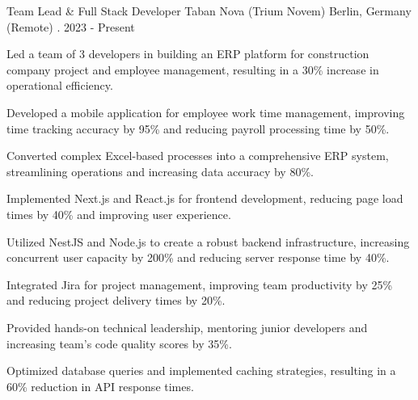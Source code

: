 

\begin{cventries}

  \cventry
    {Team Lead \& Full Stack Developer} %
    {Taban Nova (Trium Novem)} %
    {Berlin, Germany (Remote)} %
    {\shortmonthname[08]. 2023 - Present} %
    {
      \begin{cvitems} %
        \item {Led a team of 3 developers in building an ERP platform for construction company project and employee management, resulting in a 30\% increase in operational efficiency.}
        \item {Developed a mobile application for employee work time management, improving time tracking accuracy by 95\% and reducing payroll processing time by 50\%.}
        \item {Converted complex Excel-based processes into a comprehensive ERP system, streamlining operations and increasing data accuracy by 80\%.}
        \item { Implemented Next.js and React.js for frontend development, reducing page load times by 40\% and improving user experience.}
        \item {Utilized NestJS and Node.js to create a robust backend infrastructure, increasing concurrent user capacity by 200\% and reducing server response time by 40\%.}
        \item {Integrated Jira for project management, improving team productivity by 25\% and reducing project delivery times by 20\%.}
        \item {Provided hands-on technical leadership, mentoring junior developers and increasing team's code quality scores by 35\%.}
        \item{Optimized database queries and implemented caching strategies, resulting in a 60\% reduction in API response times.}
      \end{cvitems}
    }
    

\end{cventries}
